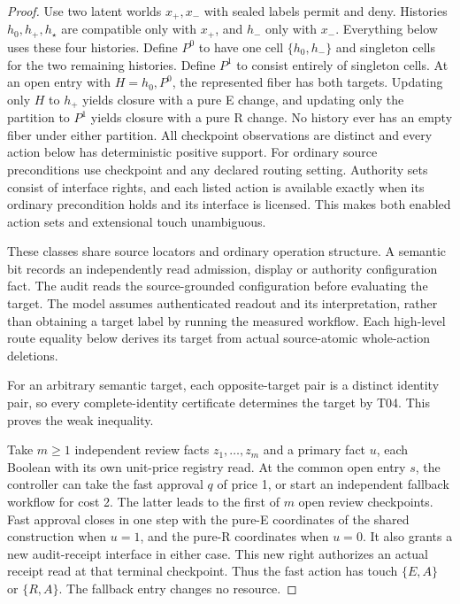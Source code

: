 \begin{proof}

Use two latent worlds \(x_+,x_-\) with sealed labels permit and deny. Histories \(h_0,h_+,h_{\star}\) are compatible only with \(x_+\), and \(h_-\) only with \(x_-\). Everything below uses these four histories. Define \(P^0\) to have one cell \(\{h_0,h_-\}\) and singleton cells for the two remaining histories. Define \(P^1\) to consist entirely of singleton cells. At an open entry with \(H=h_0,P^0\), the represented fiber has both targets. Updating only \(H\) to \(h_+\) yields closure with a pure E change, and updating only the partition to \(P^1\) yields closure with a pure R change. No history ever has an empty fiber under either partition. All checkpoint observations are distinct and every action below has deterministic positive support. For ordinary source preconditions use checkpoint and any declared routing setting. Authority sets consist of interface rights, and each listed action is available exactly when its ordinary precondition holds and its interface is licensed. This makes both enabled action sets and extensional touch unambiguous.

These classes share source locators and ordinary operation structure. A semantic bit records an independently read admission, display or authority configuration fact. The audit reads the source-grounded configuration before evaluating the target. The model assumes authenticated readout and its interpretation, rather than obtaining a target label by running the measured workflow. Each high-level route equality below derives its target from actual source-atomic whole-action deletions.

For an arbitrary semantic target, each opposite-target pair is a distinct identity pair, so every complete-identity certificate determines the target by T04. This proves the weak inequality.

Take \(m\ge1\) independent review facts \(z_1,\ldots,z_m\) and a primary fact \(u\), each Boolean with its own unit-price registry read. At the common open entry \(s\), the controller can take the fast approval \(q\) of price 1, or start an independent fallback workflow for cost 2. The latter leads to the first of \(m\) open review checkpoints. Fast approval closes in one step with the pure-E coordinates of the shared construction when \(u=1\), and the pure-R coordinates when \(u=0\). It also grants a new audit-receipt interface in either case. This new right authorizes an actual receipt read at that terminal checkpoint. Thus the fast action has touch \(\{E,A\}\) or \(\{R,A\}\). The fallback entry changes no resource.


\end{proof}
